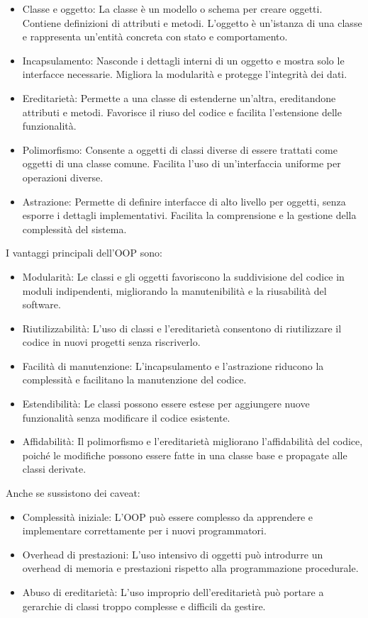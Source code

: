 \documentclass[
  letterpaper,
]{scrbook}
\providecommand{\tightlist}{%
  \setlength{\itemsep}{0pt}\setlength{\parskip}{0pt}}\usepackage{longtable,booktabs,array}
\begin{document}
\begin{itemize}
\tightlist
\item
  Classe e oggetto: La classe è un modello o schema per creare oggetti.
  Contiene definizioni di attributi e metodi. L'oggetto è un'istanza di
  una classe e rappresenta un'entità concreta con stato e comportamento.
\item
  Incapsulamento: Nasconde i dettagli interni di un oggetto e mostra
  solo le interfacce necessarie. Migliora la modularità e protegge
  l'integrità dei dati.
\item
  Ereditarietà: Permette a una classe di estenderne un'altra,
  ereditandone attributi e metodi. Favorisce il riuso del codice e
  facilita l'estensione delle funzionalità.
\item
  Polimorfismo: Consente a oggetti di classi diverse di essere trattati
  come oggetti di una classe comune. Facilita l'uso di un'interfaccia
  uniforme per operazioni diverse.
\item
  Astrazione: Permette di definire interfacce di alto livello per
  oggetti, senza esporre i dettagli implementativi. Facilita la
  comprensione e la gestione della complessità del sistema.
\end{itemize}

I vantaggi principali dell'OOP sono:

\begin{itemize}
\tightlist
\item
  Modularità: Le classi e gli oggetti favoriscono la suddivisione del
  codice in moduli indipendenti, migliorando la manutenibilità e la
  riusabilità del software.
\item
  Riutilizzabilità: L'uso di classi e l'ereditarietà consentono di
  riutilizzare il codice in nuovi progetti senza riscriverlo.
\item
  Facilità di manutenzione: L'incapsulamento e l'astrazione riducono la
  complessità e facilitano la manutenzione del codice.
\item
  Estendibilità: Le classi possono essere estese per aggiungere nuove
  funzionalità senza modificare il codice esistente.
\item
  Affidabilità: Il polimorfismo e l'ereditarietà migliorano
  l'affidabilità del codice, poiché le modifiche possono essere fatte in
  una classe base e propagate alle classi derivate.
\end{itemize}

Anche se sussistono dei caveat:

\begin{itemize}
\tightlist
\item
  Complessità iniziale: L'OOP può essere complesso da apprendere e
  implementare correttamente per i nuovi programmatori.
\item
  Overhead di prestazioni: L'uso intensivo di oggetti può introdurre un
  overhead di memoria e prestazioni rispetto alla programmazione
  procedurale.
\item
  Abuso di ereditarietà: L'uso improprio dell'ereditarietà può portare a
  gerarchie di classi troppo complesse e difficili da gestire.
\end{itemize}
\end{document}
